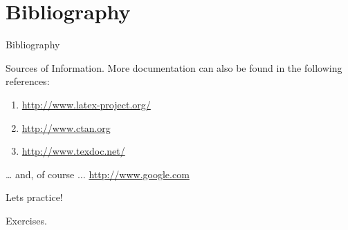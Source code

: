 \section{Bibliography}
\begin{frame}{Bibliography}
\footnotesize
  \nocite{*}
  
  
\end{frame}

\begin{frame}{Sources of Information.}
More documentation can also be found in the following references:
\begin{enumerate}
\item \url{http://www.latex-project.org/}
\item \url{http://www.ctan.org}
\item \url{http://www.texdoc.net/}
\end{enumerate}
\ldots
and, of course $\ldots$ \pause \url{http://www.google.com}
\end{frame}


\begin{frame}{Lets practice!}
 \begin{center}
   \huge Exercises. 
 \end{center}
\end{frame}


